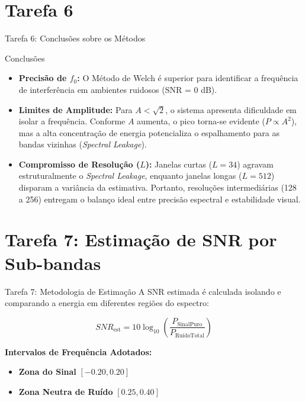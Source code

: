 \documentclass[10pt]{beamer}
\begin{document}
\section{Tarefa 6}
\begin{frame}{Tarefa 6: Conclusões sobre os Métodos}
    \begin{block}{Conclusões}
    \begin{itemize}
        \item \textbf{Precisão de $f_0$:} O Método de Welch é superior para
            identificar a frequência de interferência em ambientes ruidosos
            (SNR = 0 dB).
        \item \textbf{Limites de Amplitude:} Para $A < \sqrt{2}$, o sistema
            apresenta dificuldade em isolar a frequência. Conforme $A$ aumenta,
            o pico torna-se evidente ($P \propto A^2$), mas a alta concentração
            de energia potencializa o espalhamento para as bandas vizinhas
            (\textit{Spectral Leakage}).
        \item \textbf{Compromisso de Resolução ($L$):} Janelas curtas ($L =
            34$) agravam estruturalmente o \textit{Spectral Leakage}, enquanto
            janelas longas ($L = 512$) disparam a variância da estimativa.
            Portanto, resoluções intermediárias (128 a 256) entregam o balanço
            ideal entre precisão espectral e estabilidade visual.
    \end{itemize}
    \end{block}
\end{frame}

\section{Tarefa 7: Estimação de SNR por Sub-bandas}

\begin{frame}{Tarefa 7: Metodologia de Estimação}
    A SNR estimada é calculada isolando e comparando a energia em diferentes regiões do espectro:
    
    \begin{equation*}
        SNR_{\text{est}} = 10 \log_{10} \left( \frac{P_{\text{SinalPuro}}}{P_{\text{RuídoTotal}}} \right)
    \end{equation*}
    
    \vspace{0.3cm}
    \textbf{Intervalos de Frequência Adotados:}
    \begin{itemize}
        \item \textbf{Zona do Sinal} $[ -0.20, 0.20 ]$
        \item \textbf{Zona Neutra de Ruído} $[ 0.25, 0.40 ]$
    \end{itemize}
\end{frame}
\end{document}
